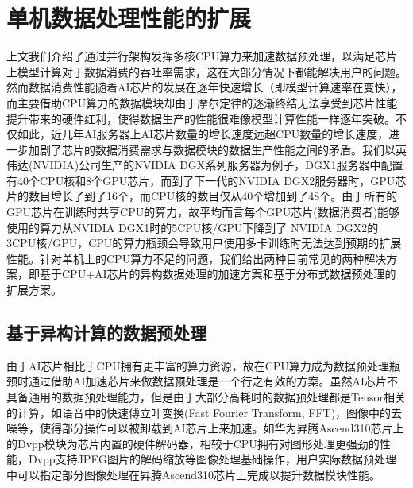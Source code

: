 \documentclass[letterpaper,10pt,english]{sphinxmanual}
\begin{document}
\section{单机数据处理性能的扩展}
\label{\detokenize{chapter_data_processing/extension:id1}}\label{\detokenize{chapter_data_processing/extension::doc}}
\sphinxAtStartPar
上文我们介绍了通过并行架构发挥多核CPU算力来加速数据预处理，以满足芯片上模型计算对于数据消费的吞吐率需求，这在大部分情况下都能解决用户的问题。然而数据消费性能随着AI芯片的发展在逐年快速增长（即模型计算速率在变快），而主要借助CPU算力的数据模块却由于摩尔定律的逐渐终结无法享受到芯片性能提升带来的硬件红利，使得数据生产的性能很难像模型计算性能一样逐年突破。不仅如此，近几年AI服务器上AI芯片数量的增长速度远超CPU数量的增长速度，进一步加剧了芯片的数据消费需求与数据模块的数据生产性能之间的矛盾。我们以英伟达(NVIDIA)公司生产的NVIDIA
DGX系列服务器为例子，DGX\sphinxhyphen{}1服务器中配置有40个CPU核和8个GPU芯片，而到了下一代的NVIDIA
DGX\sphinxhyphen{}2服务器时，GPU芯片的数目增长了到了16个，而CPU核的数目仅从40个增加到了48个。由于所有的GPU芯片在训练时共享CPU的算力，故平均而言每个GPU芯片(数据消费者)能够使用的算力从NVIDIA
DGX\sphinxhyphen{}1时的5CPU核/GPU下降到了 NVIDIA
DGX\sphinxhyphen{}2的3CPU核/GPU，CPU的算力瓶颈会导致用户使用多卡训练时无法达到预期的扩展性能。针对单机上的CPU算力不足的问题，我们给出两种目前常见的两种解决方案，即基于CPU+AI芯片的异构数据处理的加速方案和基于分布式数据预处理的扩展方案。


\subsection{基于异构计算的数据预处理}
\label{\detokenize{chapter_data_processing/extension:id2}}
\sphinxAtStartPar
由于AI芯片相比于CPU拥有更丰富的算力资源，故在CPU算力成为数据预处理瓶颈时通过借助AI加速芯片来做数据预处理是一个行之有效的方案。虽然AI芯片不具备通用的数据预处理能力，但是由于大部分高耗时的数据预处理都是Tensor相关的计算，如语音中的快速傅立叶变换(Fast
Fourier Transform,
FFT)，图像中的去噪等，使得部分操作可以被卸载到AI芯片上来加速。如华为昇腾Ascend310芯片上的Dvpp模块为芯片内置的硬件解码器，相较于CPU拥有对图形处理更强劲的性能，Dvpp支持JPEG图片的解码缩放等图像处理基础操作，用户实际数据预处理中可以指定部分图像处理在昇腾Ascend310芯片上完成以提升数据模块性能。
\end{document}
